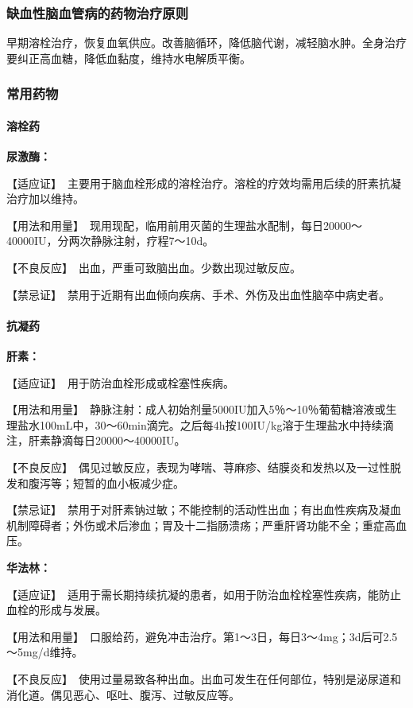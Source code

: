 \subsubsection{缺血性脑血管病的药物治疗原则}

早期溶栓治疗，恢复血氧供应。改善脑循环，降低脑代谢，减轻脑水肿。全身治疗要纠正高血糖，降低血黏度，维持水电解质平衡。

\subsubsection{常用药物}
\paragraph{溶栓药}

\textbf{尿激酶：}

【适应证】　主要用于脑血栓形成的溶栓治疗。溶栓的疗效均需用后续的肝素抗凝治疗加以维持。

【用法和用量】　现用现配，临用前用灭菌的生理盐水配制，每日20000～40000IU，分两次静脉注射，疗程7～10d。

【不良反应】　出血，严重可致脑出血。少数出现过敏反应。

【禁忌证】　禁用于近期有出血倾向疾病、手术、外伤及出血性脑卒中病史者。
\paragraph{抗凝药}

\textbf{肝素：}

【适应证】　用于防治血栓形成或栓塞性疾病。

【用法和用量】　静脉注射：成人初始剂量5000IU加入5％～10％葡萄糖溶液或生理盐水100mL中，30～60min滴完。之后每4h按100IU/kg溶于生理盐水中持续滴注，肝素静滴每日20000～40000IU。

【不良反应】　偶见过敏反应，表现为哮喘、荨麻疹、结膜炎和发热以及一过性脱发和腹泻等；短暂的血小板减少症。

【禁忌证】　禁用于对肝素钠过敏；不能控制的活动性出血；有出血性疾病及凝血机制障碍者；外伤或术后渗血；胃及十二指肠溃疡；严重肝肾功能不全；重症高血压。

\textbf{华法林：}

【适应证】　适用于需长期持续抗凝的患者，如用于防治血栓栓塞性疾病，能防止血栓的形成与发展。

【用法和用量】　口服给药，避免冲击治疗。第1～3日，每日3～4mg；3d后可2.5～5mg/d维持。

【不良反应】　使用过量易致各种出血。出血可发生在任何部位，特别是泌尿道和消化道。偶见恶心、呕吐、腹泻、过敏反应等。

